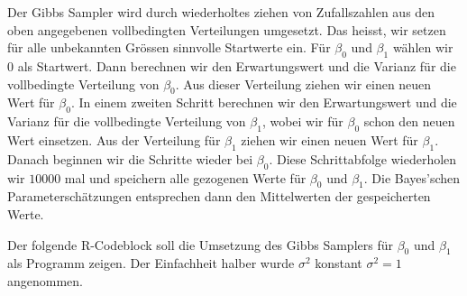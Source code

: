 \documentclass[]{book}
\begin{document}
Der Gibbs Sampler wird durch wiederholtes ziehen von Zufallszahlen aus
den oben angegebenen vollbedingten Verteilungen umgesetzt. Das heisst,
wir setzen für alle unbekannten Grössen sinnvolle Startwerte ein. Für
\(\beta_0\) und \(\beta_1\) wählen wir \(0\) als Startwert. Dann
berechnen wir den Erwartungswert und die Varianz für die vollbedingte
Verteilung von \(\beta_0\). Aus dieser Verteilung ziehen wir einen neuen
Wert für \(\beta_0\). In einem zweiten Schritt berechnen wir den
Erwartungswert und die Varianz für die vollbedingte Verteilung von
\(\beta_1\), wobei wir für \(\beta_0\) schon den neuen Wert einsetzen.
Aus der Verteilung für \(\beta_1\) ziehen wir einen neuen Wert für
\(\beta_1\). Danach beginnen wir die Schritte wieder bei \(\beta_0\).
Diese Schrittabfolge wiederholen wir \(10000\) mal und speichern alle
gezogenen Werte für \(\beta_0\) und \(\beta_1\). Die Bayes'schen
Parameterschätzungen entsprechen dann den Mittelwerten der gespeicherten
Werte.

Der folgende R-Codeblock soll die Umsetzung des Gibbs Samplers für
\(\beta_0\) und \(\beta_1\) als Programm zeigen. Der Einfachheit halber
wurde \(\sigma^2\) konstant \(\sigma^2=1\) angenommen.
\end{document}
